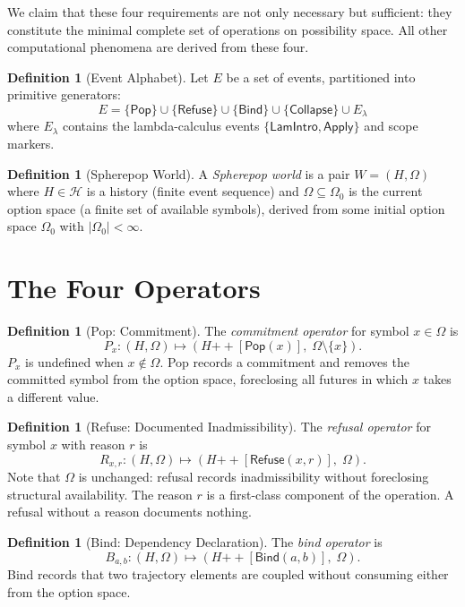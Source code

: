 \documentclass[12pt, a4paper, openany]{book}
\theoremstyle{plain}
\theoremstyle{definition}
\newtheorem{definition}[theorem]{Definition}
\theoremstyle{remark}
\newcommand{\Pop}{\mathsf{Pop}}
\newcommand{\Refuse}{\mathsf{Refuse}}
\newcommand{\Bind}{\mathsf{Bind}}
\newcommand{\Collapse}{\mathsf{Collapse}}
\newcommand{\calH}{\mathcal{H}}
\begin{document}
We claim that these four requirements are not only necessary but sufficient: they
constitute the minimal complete set of operations on possibility space. All other
computational phenomena are derived from these four.

\begin{definition}[Event Alphabet]
Let $E$ be a set of events, partitioned into primitive generators:
\[
E = \{\Pop\} \cup \{\Refuse\} \cup \{\Bind\} \cup \{\Collapse\} \cup E_\lambda
\]
where $E_\lambda$ contains the lambda-calculus events $\{\mathsf{LamIntro},
\mathsf{Apply}\}$ and scope markers.
\end{definition}

\begin{definition}[Spherepop World]
A \emph{Spherepop world} is a pair $W = (H, \Omega)$ where $H \in \calH$ is a
history (finite event sequence) and $\Omega \subseteq \Omega_0$ is the current
option space (a finite set of available symbols), derived from some initial option
space $\Omega_0$ with $|\Omega_0| < \infty$.
\end{definition}

\section{The Four Operators}

\begin{definition}[Pop: Commitment]
The \emph{commitment operator} for symbol $x \in \Omega$ is
\[
P_x : (H, \Omega) \mapsto (H \mathbin{++} [\Pop(x)],\; \Omega \setminus \{x\}).
\]
$P_x$ is undefined when $x \notin \Omega$. Pop records a commitment and removes
the committed symbol from the option space, foreclosing all futures in which $x$
takes a different value.
\end{definition}

\begin{definition}[Refuse: Documented Inadmissibility]
The \emph{refusal operator} for symbol $x$ with reason $r$ is
\[
R_{x,r} : (H, \Omega) \mapsto (H \mathbin{++} [\Refuse(x, r)],\; \Omega).
\]
Note that $\Omega$ is unchanged: refusal records inadmissibility without
foreclosing structural availability. The reason $r$ is a first-class component
of the operation. A refusal without a reason documents nothing.
\end{definition}

\begin{definition}[Bind: Dependency Declaration]
The \emph{bind operator} is
\[
B_{a,b} : (H, \Omega) \mapsto (H \mathbin{++} [\Bind(a, b)],\; \Omega).
\]
Bind records that two trajectory elements are coupled without consuming either
from the option space.
\end{definition}
\end{document}
